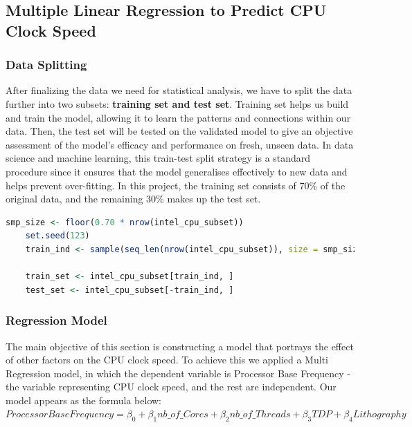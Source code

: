 \subsection{Multiple Linear Regression to Predict CPU Clock Speed}

\subsubsection{Data Splitting}
After finalizing the data we need for statistical analysis, we have to split the data further into two subsets: \textbf{training set and test set}. Training set helps us build and train the model, allowing it to learn the patterns and connections within our data. Then, the test set will be tested on the validated model to give an objective assessment of the model's efficacy and performance on fresh, unseen data. In data science and machine learning, this train-test split strategy is a standard procedure since it ensures that the model generalises effectively to new data and helps prevent over-fitting. In this project, the training set consists of 70\% of the original data, and the remaining 30\% makes up the test set.

\begin{lstlisting}[language=R]
    smp_size <- floor(0.70 * nrow(intel_cpu_subset))
    set.seed(123)
    train_ind <- sample(seq_len(nrow(intel_cpu_subset)), size = smp_size)
    
    train_set <- intel_cpu_subset[train_ind, ]
    test_set <- intel_cpu_subset[-train_ind, ]
\end{lstlisting}

\subsubsection{Regression Model}
The main objective of this section is constructing a model that portrays the effect of other factors on the CPU clock speed. To achieve this we applied a Multi Regression model, in which the dependent variable is Processor Base Frequency - the variable representing CPU clock speed, and the rest are independent. Our model appears as the formula below:\\

$Processor Base Frequency = \beta_0 + \beta_1 nb\_of\_Cores + \beta_2 nb\_of\_Threads + \beta_3 TDP + \beta_4 Lithography$ \\

